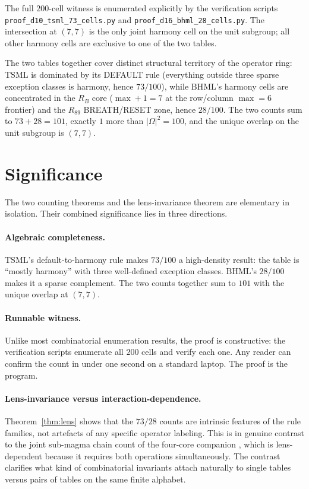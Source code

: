 \documentclass[11pt,reqno]{amsart}
\theoremstyle{plain}
\theoremstyle{definition}
\theoremstyle{remark}
\newcommand{\TSML}{\mathrm{TSML}}
\newcommand{\BHML}{\mathrm{BHML}}
\begin{document}
The full $200$-cell witness is enumerated explicitly by the
verification scripts \texttt{proof\_d10\_tsml\_73\_cells.py} and
\texttt{proof\_d16\_bhml\_28\_cells.py}. The intersection at
$(7, 7)$ is the only joint harmony cell on the unit subgroup; all
other harmony cells are exclusive to one of the two tables.

The two tables together cover distinct structural territory of the
operator ring: $\TSML$ is dominated by its DEFAULT rule (everything
outside three sparse exception classes is harmony, hence
$73/100$), while $\BHML$'s harmony cells are concentrated in the
$R_B$ core ($\max + 1 = 7$ at the row/column $\max = 6$ frontier)
and the $R_{89}$ BREATH/RESET zone, hence $28/100$. The two counts
sum to $73 + 28 = 101$, exactly $1$ more than $|\Omega|^2 = 100$,
and the unique overlap on the unit subgroup is $(7, 7)$.

\section{Significance}\label{sec:sig}

The two counting theorems and the lens-invariance theorem are
elementary in isolation. Their combined significance lies in three
directions.

\paragraph{Algebraic completeness.}
$\TSML$'s default-to-harmony rule makes $73/100$ a high-density
result: the table is ``mostly harmony'' with three well-defined
exception classes. $\BHML$'s $28/100$ makes it a sparse complement.
The two counts together sum to $101$ with the unique overlap at
$(7, 7)$.

\paragraph{Runnable witness.}
Unlike most combinatorial enumeration results, the proof is
constructive: the verification scripts enumerate all $200$ cells
and verify each one. Any reader can confirm the count in under one
second on a standard laptop. The proof is the program.

\paragraph{Lens-invariance versus interaction-dependence.}
Theorem~\ref{thm:lens} shows that the $73/28$ counts are intrinsic
features of the rule families, not artefacts of any specific
operator labeling. This is in genuine contrast to the joint
sub-magma chain count of the four-core companion \cite{J02}, which
is lens-dependent because it requires both operations
simultaneously. The contrast clarifies what kind of combinatorial
invariants attach naturally to single tables versus pairs of
tables on the same finite alphabet.
\end{document}
